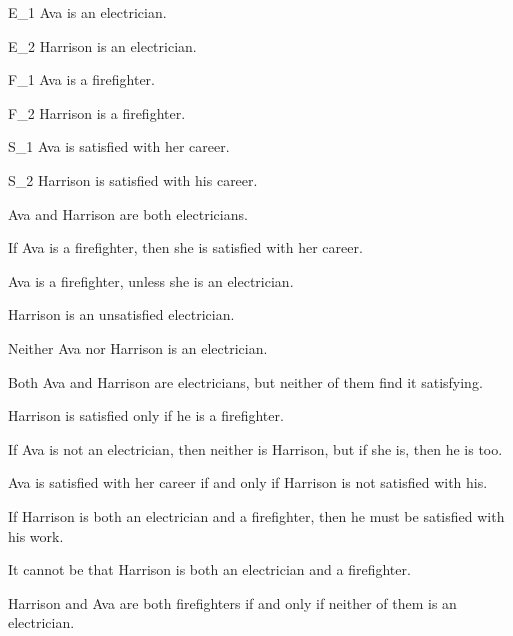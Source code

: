 \problempart\label{pr.avacareer}
	\begin{ekey}
		\item[E_1] Ava is an electrician.
		\item[E_2] Harrison is an electrician.
		\item[F_1] Ava is a firefighter.
		\item[F_2] Harrison is a firefighter.
		\item[S_1] Ava is satisfied with her career.
		\item[S_2] Harrison is satisfied with his career.
	\end{ekey}
\begin{earg}
\item Ava and Harrison are both electricians.
\item[] 
\item If Ava is a firefighter, then she is satisfied with her career.
\item[] 
\item Ava is a firefighter, unless she is an electrician.
\item[] 
\item Harrison is an unsatisfied electrician.
\item[] 
\item Neither Ava nor Harrison is an electrician.
\item[] 
\item Both Ava and Harrison are electricians, but neither of them find it satisfying.
\item[] 
\item Harrison is satisfied only if he is a firefighter.
\item[] 
\item If Ava is not an electrician, then neither is Harrison, but if she is, then he is too.
\item[] 
\item Ava is satisfied with her career if and only if Harrison is not satisfied with his.
\item[] 
\item If Harrison is both an electrician and a firefighter, then he must be satisfied with his work.
\item[] 
\item It cannot be that Harrison is both an electrician and a firefighter.
\item[] 
\item Harrison and Ava are both firefighters if and only if neither of them is an electrician.
\item[] 
\end{earg}

